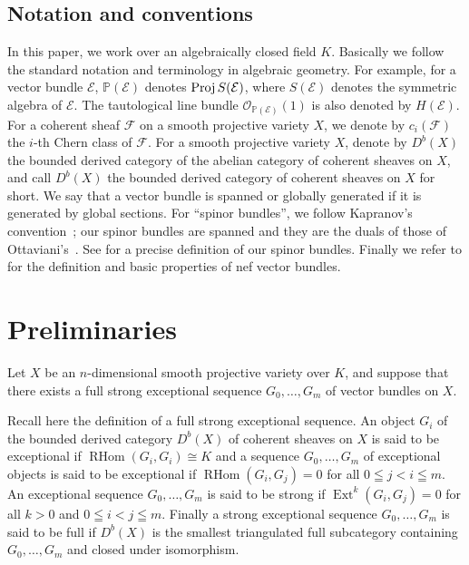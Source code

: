 \documentclass[a4paper,12pt]{amsart}
\newcommand{\proj}{\mathop{\rm Proj}\nolimits}
\DeclareMathOperator{\Ext}{Ext}
\DeclareMathOperator{\RHom}{RHom}
\begin{document}
\subsection{Notation and conventions}\label{convention}
In this paper, 
we work over an algebraically closed field $K$.
Basically we follow the standard notation and terminology in algebraic
geometry. 
For example, for a vector bundle $\mathcal{E}$,
$\mathbb{P}(\mathcal{E})$ denotes $\proj S(\mathcal{E})$,
where $S(\mathcal{E})$ denotes the symmetric algebra of $\mathcal{E}$.
The tautological line bundle $\mathcal{O}_{\mathbb{P}(\mathcal{E})}(1)$
is also denoted by $H(\mathcal{E})$.
For a 
coherent sheaf $\mathcal{F}$ on a smooth projective variety $X$,
we denote by $c_i(\mathcal{F})$ the $i$-th Chern class of $\mathcal{F}$.
For a smooth projective variety $X$,
denote by $D^b(X)$ the bounded derived category of the abelian category of coherent sheaves on $X$,
and call $D^b(X)$ the bounded derived category of coherent sheaves on $X$ for short.
We say that a vector bundle is spanned or globally generated
if it is generated by global sections.
For ``spinor bundles'',
we  follow Kapranov's convention~\cite{MR0939472};
our spinor bundles are spanned
and they are the 
duals
of those of Ottaviani's~\cite{ot}.
See \cite[\S 5 Definition 1]{MR3275418} for a precise definition of our spinor bundles.
Finally we refer to \cite{MR2095472} for the definition
and basic properties of nef vector bundles.

%
%

\section{Preliminaries}\label{Preliminaries}
Let $X$ be an $n$-dimensional smooth projective variety over $K$,
and suppose that there exists a full strong exceptional sequence
$G_0,\dots,G_m$ of vector bundles on $X$.

Recall here the definition of a full strong exceptional sequence.
An object $G_i$ of the bounded derived category $D^b(X)$ 
of coherent sheaves on $X$ is said to be 
exceptional if $\RHom (G_i, G_i)\cong K$
and a sequence $G_0,\dots,G_m$ of exceptional objects 
is said to be exceptional
if $\RHom (G_i, G_j)=0$ for all $0\leqq j<i\leqq m$.
An exceptional sequence $G_0,\dots,G_m$ is said to be strong
if $\Ext^k(G_i, G_j)=0$ for all $k>0$ and $0\leqq i<j\leqq m$.
Finally a strong exceptional sequence $G_0,\dots,G_m$
is said to be full if $D^b(X)$ is the smallest triangulated full subcategory
containing $G_0,\dots,G_m$ and closed under isomorphism. 
\end{document}
